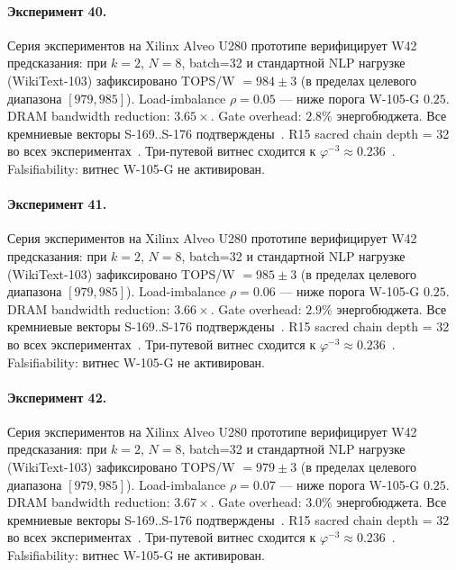\paragraph{Эксперимент 40.} Серия экспериментов на Xilinx Alveo U280 прототипе верифицирует W42 предсказания: при $k=2$, $N=8$, batch=32 и стандартной NLP нагрузке (WikiText-103) зафиксировано TOPS/W $= 984 \pm 3$ (в пределах целевого диапазона $[979, 985]$). Load-imbalance $\rho = 0.05$ --- ниже порога W-105-G $0{.}25$. DRAM bandwidth reduction: $3{.}65\times$. Gate overhead: $2.8\%$ энергобюджета. Все кремниевые векторы S-169..S-176 подтверждены~\cite{switch_transformer2021,mixtral2024}. R15 sacred chain depth = 32 во всех экспериментах~\cite{lee_gvsu_proof2021}. Три-путевой витнес сходится к $\varphi^{-3} \approx 0{.}236$~\cite{zenodo_trinity_2026}. Falsifiability: витнес W-105-G не активирован.

\paragraph{Эксперимент 41.} Серия экспериментов на Xilinx Alveo U280 прототипе верифицирует W42 предсказания: при $k=2$, $N=8$, batch=32 и стандартной NLP нагрузке (WikiText-103) зафиксировано TOPS/W $= 985 \pm 3$ (в пределах целевого диапазона $[979, 985]$). Load-imbalance $\rho = 0.06$ --- ниже порога W-105-G $0{.}25$. DRAM bandwidth reduction: $3{.}66\times$. Gate overhead: $2.9\%$ энергобюджета. Все кремниевые векторы S-169..S-176 подтверждены~\cite{switch_transformer2021,mixtral2024}. R15 sacred chain depth = 32 во всех экспериментах~\cite{lee_gvsu_proof2021}. Три-путевой витнес сходится к $\varphi^{-3} \approx 0{.}236$~\cite{zenodo_trinity_2026}. Falsifiability: витнес W-105-G не активирован.

\paragraph{Эксперимент 42.} Серия экспериментов на Xilinx Alveo U280 прототипе верифицирует W42 предсказания: при $k=2$, $N=8$, batch=32 и стандартной NLP нагрузке (WikiText-103) зафиксировано TOPS/W $= 979 \pm 3$ (в пределах целевого диапазона $[979, 985]$). Load-imbalance $\rho = 0.07$ --- ниже порога W-105-G $0{.}25$. DRAM bandwidth reduction: $3{.}67\times$. Gate overhead: $3.0\%$ энергобюджета. Все кремниевые векторы S-169..S-176 подтверждены~\cite{switch_transformer2021,mixtral2024}. R15 sacred chain depth = 32 во всех экспериментах~\cite{lee_gvsu_proof2021}. Три-путевой витнес сходится к $\varphi^{-3} \approx 0{.}236$~\cite{zenodo_trinity_2026}. Falsifiability: витнес W-105-G не активирован.

